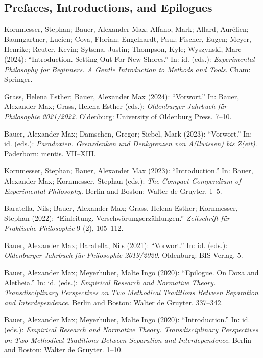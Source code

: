 \documentclass[a4paper,10pt]{article}
\newenvironment{literature}{%
   \parskip6pt\parindent0pt\raggedright
   \def\lititem{\hangindent=1cm\hangafter1}}{%
   \par\ignorespaces}
\begin{document}
\subsection*{Prefaces, Introductions, and Epilogues}
\begin{literature}
\lititem Kornmesser, Stephan; Bauer, Alexander Max; Alfano, Mark; Allard, Aurélien; Baumgartner, Lucien; Cova, Florian; Engelhardt, Paul; Fischer, Eugen; Meyer, Henrike; Reuter, Kevin; Sytsma, Justin; Thompson, Kyle; Wyszynski, Marc (2024): \enquote{Introduction. Setting Out For New Shores.} In: id. (eds.): \textit{Experimental Philosophy for Beginners. A Gentle Introduction to Methods and Tools}. Cham: Springer.

\lititem Grass, Helena Esther; Bauer, Alexander Max (2024): \enquote{Vorwort.} In: Bauer, Alexander Max; Grass, Helena Esther (eds.): \textit{Oldenburger Jahrbuch für Philosophie 2021/2022}. Oldenburg: University of Oldenburg Press. 7--10.

\lititem Bauer, Alexander Max; Damschen, Gregor; Siebel, Mark (2023): \enquote{Vorwort.} In: id. (eds.): \textit{Paradoxien. Grenzdenken und Denkgrenzen von A(llwissen) bis Z(eit)}. Paderborn: mentis. VII--XIII.

\lititem Kornmesser, Stephan; Bauer, Alexander Max (2023): \enquote{Introduction.} In: Bauer, Alexander Max; Kornmesser, Stephan (eds.): \textit{The Compact Compendium of Experimental Philosophy}. Berlin and Boston: Walter de Gruyter. 1--5.

\lititem Baratella, Nils; Bauer, Alexander Max; Grass, Helena Esther; Kornmesser, Stephan (2022): \enquote{Einleitung. Verschwörungserzählungen.} \textit{Zeitschrift für Praktische Philosophie} 9 (2), 105--112.

\lititem Bauer, Alexander Max; Baratella, Nils (2021): \enquote{Vorwort.} In: id. (eds.): \textit{Oldenburger Jahrbuch für Philosophie 2019/2020}. Oldenburg: BIS-Verlag. 5.

\lititem Bauer, Alexander Max; Meyerhuber, Malte Ingo (2020): \enquote{Epilogue. On Doxa and Aletheia.} In: id. (eds.): \textit{Empirical Research and Normative Theory. Transdisciplinary Perspectives on Two Methodical Traditions Between Separation and Interdependence}. Berlin and Boston: Walter de Gruyter. 337--342.

\lititem Bauer, Alexander Max; Meyerhuber, Malte Ingo (2020): \enquote{Introduction.} In: id. (eds.): \textit{Empirical Research and Normative Theory. Transdisciplinary Perspectives on Two Methodical Traditions Between Separation and Interdependence}. Berlin and Boston: Walter de Gruyter. 1--10.


\end{literature}
\end{document}
